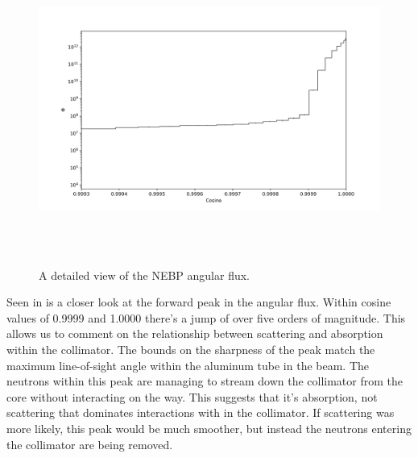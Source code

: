 %
\begin{figure}[htb]
\centering
\includegraphics[height=4in]{tex/figures/flux_cos_detail.png}
\caption[Detailed Flux vs. Angle]{A detailed view of the NEBP angular flux.}
\label{fig:flux_cos_detail}
\end{figure}

Seen in  is a closer look at the forward peak in the angular flux.
Within cosine values of 0.9999 and 1.0000 there's a jump of over five orders of magnitude.
This allows us to comment on the relationship between scattering and absorption within the collimator.
The bounds on the sharpness of the peak match the maximum line-of-sight angle within the aluminum tube in the beam.
The neutrons within this peak are managing to stream down the collimator from the core without interacting on the way.
This suggests that it's absorption, not scattering that dominates interactions with in the collimator.
If scattering was more likely, this peak would be much smoother, but instead the neutrons entering the collimator are being removed.

